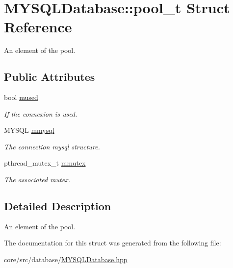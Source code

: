 \hypertarget{structMYSQLDatabase_1_1pool__t}{
\section{MYSQLDatabase::pool\_\-t Struct Reference}
\label{structMYSQLDatabase_1_1pool__t}
}


An element of the pool.  


\subsection*{Public Attributes}
\begin{DoxyCompactItemize}
\item 
\hypertarget{structMYSQLDatabase_1_1pool__t_ac7a9b13ff2dd5188479f78458f435055}{
bool \hyperlink{structMYSQLDatabase_1_1pool__t_ac7a9b13ff2dd5188479f78458f435055}{mused}}
\label{structMYSQLDatabase_1_1pool__t_ac7a9b13ff2dd5188479f78458f435055}

\begin{DoxyCompactList}\small\item\em If the connexion is used. \item\end{DoxyCompactList}\item 
\hypertarget{structMYSQLDatabase_1_1pool__t_a02c0ea818cd2a856ca87e4db38113a43}{
MYSQL \hyperlink{structMYSQLDatabase_1_1pool__t_a02c0ea818cd2a856ca87e4db38113a43}{mmysql}}
\label{structMYSQLDatabase_1_1pool__t_a02c0ea818cd2a856ca87e4db38113a43}

\begin{DoxyCompactList}\small\item\em The connection mysql structure. \item\end{DoxyCompactList}\item 
\hypertarget{structMYSQLDatabase_1_1pool__t_a16c6b8c915d44b0248d37d4700d59b56}{
pthread\_\-mutex\_\-t \hyperlink{structMYSQLDatabase_1_1pool__t_a16c6b8c915d44b0248d37d4700d59b56}{mmutex}}
\label{structMYSQLDatabase_1_1pool__t_a16c6b8c915d44b0248d37d4700d59b56}

\begin{DoxyCompactList}\small\item\em The associated mutex. \item\end{DoxyCompactList}\end{DoxyCompactItemize}


\subsection{Detailed Description}
An element of the pool. 

The documentation for this struct was generated from the following file:\begin{DoxyCompactItemize}
\item 
core/src/database/\hyperlink{MYSQLDatabase_8hpp}{MYSQLDatabase.hpp}\end{DoxyCompactItemize}
